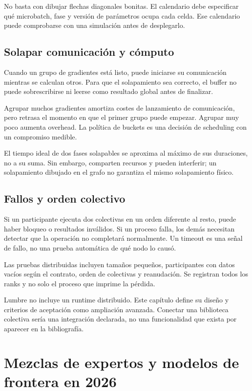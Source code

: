 \documentclass[12pt,a4paper,oneside]{report}
\begin{document}
No basta con dibujar flechas diagonales bonitas. El calendario debe especificar qué microbatch, fase y versión de parámetros ocupa cada celda. Ese calendario puede comprobarse con una simulación antes de desplegarlo.

\section{Solapar comunicación y cómputo}
Cuando un grupo de gradientes está listo, puede iniciarse su comunicación mientras se calculan otros. Para que el solapamiento sea correcto, el buffer no puede sobrescribirse ni leerse como resultado global antes de finalizar.

Agrupar muchos gradientes amortiza costes de lanzamiento de comunicación, pero retrasa el momento en que el primer grupo puede empezar. Agrupar muy poco aumenta overhead. La política de buckets es una decisión de scheduling con un compromiso medible.

El tiempo ideal de dos fases solapables se aproxima al máximo de sus duraciones, no a su suma. Sin embargo, comparten recursos y pueden interferir; un solapamiento dibujado en el grafo no garantiza el mismo solapamiento físico.

\section{Fallos y orden colectivo}
Si un participante ejecuta dos colectivas en un orden diferente al resto, puede haber bloqueo o resultados inválidos. Si un proceso falla, los demás necesitan detectar que la operación no completará normalmente. Un timeout es una señal de fallo, no una prueba automática de qué nodo lo causó.

Las pruebas distribuidas incluyen tamaños pequeños, participantes con datos vacíos según el contrato, orden de colectivas y reanudación. Se registran todos los ranks y no solo el proceso que imprime la pérdida.

Lumbre no incluye un runtime distribuido. Este capítulo define su diseño y criterios de aceptación como ampliación avanzada. Conectar una biblioteca colectiva sería una integración declarada, no una funcionalidad que exista por aparecer en la bibliografía.

\chapter{Mezclas de expertos y modelos de frontera en 2026}
\label{ch:moe}
\end{document}
